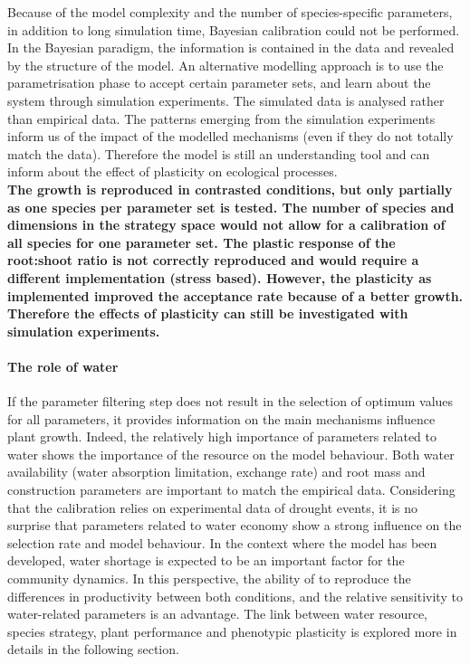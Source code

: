 Because of the model complexity and the number of species-specific parameters, in addition to long simulation time, Bayesian calibration could not be performed. In the Bayesian paradigm, the information is contained in the data and revealed by the structure of the model. An alternative modelling approach is to use the parametrisation phase to accept certain parameter sets, and learn about the system through simulation experiments. The simulated data is analysed rather than empirical data. The patterns emerging from the simulation experiments inform us of the impact of the modelled mechanisms (even if they do not totally match the data). Therefore the model is still an understanding tool and can inform about the effect of plasticity on ecological processes.\\


\textbf{The growth is reproduced in contrasted conditions, but only partially as one species per parameter set is tested. The number of species and dimensions in the strategy space would not allow for a calibration of all species for one parameter set. The plastic response of the root:shoot ratio is not correctly reproduced and would require a different implementation (stress based). However, the plasticity as implemented improved the acceptance rate because of a better growth. Therefore the effects of plasticity can still be investigated with simulation experiments.}

\paragraph{The role of water}

If the parameter filtering step does not result in the selection of optimum values for all parameters, it provides information on the main mechanisms influence plant growth. Indeed, the relatively high importance of parameters related to water shows the importance of the resource on the model behaviour. Both water availability (water absorption limitation, exchange rate) and root mass and construction parameters are important to match the empirical data. Considering that the calibration relies on experimental data of drought events, it is no surprise that parameters related to water economy show a strong influence on the selection rate and model behaviour. In the context where the model has been developed, water shortage is expected to be an important factor for the community dynamics. In this perspective, the ability of \model to reproduce the differences in productivity between both conditions, and the relative sensitivity to water-related parameters is an advantage. The link between water resource, species strategy, plant performance and phenotypic plasticity is explored more in details in the following section.\\


